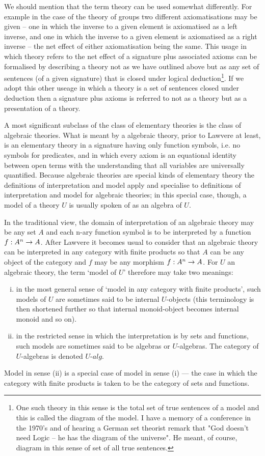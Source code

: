 \note 
We should mention that the term theory can be used somewhat differently. 
For example in the case of the theory of groups two different axiomatisations may be given 
-- one in which the inverse to a given element is axiomatised as a left inverse, and one in which the inverse to a given element is axiomatised as a right inverse --
the net effect of either axiomatisation being the same.
This usage in which  theory refers to the net effect of a signature plus associated axioms
can be formalised by describing a 
theory not as we have outlined above but as any set of sentences
 (of a given signature) that is closed under logical deduction\footnote{One such theory in this sense is the total set of true sentences of a model and  
this is called the diagram of the model. I have a  memory of a conference in the 1970's and of hearing a German set theorist
 remark that "God doesn't need Logic -- he has the diagram of the universe". He meant, of course, diagram in this sense of set of all true sentences.}. 
If we adopt this other useage in which a theory is a set of sentences closed under deduction then a signature plus axioms is referred to not as a theory but as a presentation of a theory. 

\note
A most significant subclass of the class of elementary theories is the class of algebraic theories. 
What is meant by a algebraic theory, prior to Lawvere at least, is an elementary theory in a signature having only function symbols, i.e. no symbols for predicates, 
and in which every axiom is an equational identity between open terms with the understanding that
all variables are universally quantified. 
Because algebraic theories are special kinds of elementary theory the definitions of interpretation and model apply and specialise to definitions of 
interpretation and model for algebraic theories; in this special case, though, a model of a theory $U$ is usually spoken of as an algebra of $U$.

\note
In the traditional view, the domain of interpretation of an algebraic theory may be any set $A$ 
and each n-ary function symbol is to be interpreted by a  function $f:A^n \rightarrow A$.
After Lawvere it becomes usual to consider that an algebraic theory can be interpreted in any category with finite products
 so that $A$ can be any object of the category and  $f$ may be any morphism $f:A^n \rightarrow A$. 
For $U$ an algebraic theory, the term `model of $U$' therefore may take two meanings:
\begin{enumerate}[(i)]
\item in the most general sense of `model in any category  with finite products',
 such models of $U$ are sometimes said to be internal $U$-objects (this terminology is then shortened further so that internal monoid-object becomes internal monoid and so on). 
\item in the restricted sense in which the interpretation is by sets and functions, such models are sometimes said to be algebras or
$U$-algebras. The category of $U$-algebras is denoted $U$-$alg$. 
\end{enumerate} 
Model in sense (ii) is a special case of model in sense (i) ---  the case in which the category with finite products is taken to be the category of sets and functions.

